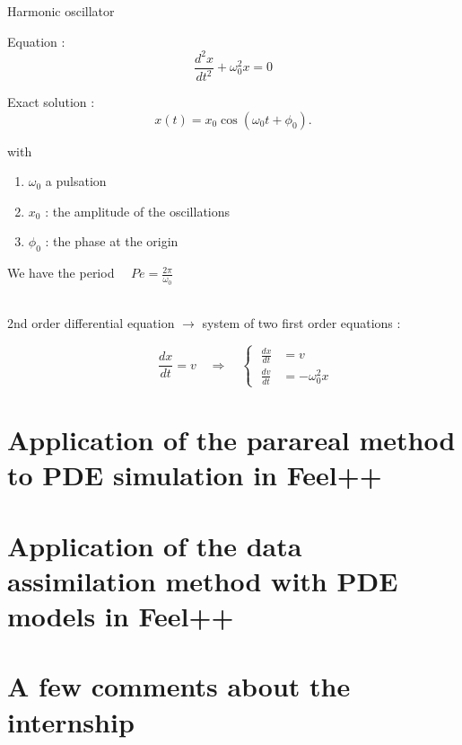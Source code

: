 \documentclass[10pt,xcolor={table,dvipsnames},t]{beamer}
\begin{document}
	\begin{frame}{Harmonic oscillator}
		\begin{minipage}{0.48\linewidth}
			Equation :
			$$\frac{d^2 x}{d t^2}+\omega_0^2 x = 0$$
		\end{minipage}
		\begin{minipage}{0.48\linewidth}
			Exact solution :
			$$x(t) = x_0 \cos(\omega_{0}t+\phi_0).$$ 
		\end{minipage}	
		with
		\begin{enumerate}[\textbullet]
			\item $\omega_0$ a pulsation
			\item $x_0$ : the amplitude of the oscillations
			\item $\phi_0$ : the phase at the origin
		\end{enumerate}
		We have the period $\quad Pe=\frac{2\pi}{\omega_0}$
		
		\; \\
		
		2nd order differential equation $\rightarrow$ system of two first order equations :
		
		$$\qquad \frac{d x}{d t}=v \quad \Rightarrow \quad \left\{\;\begin{aligned}
			\frac{d x}{d t}&=v \\
			\frac{d v}{d t}&=-\omega_0^2 x
		\end{aligned}\right.
		$$  
		
	\end{frame}

	\section{Application of the parareal method to PDE simulation in Feel++}

	
	
	\section{Application of the data assimilation method with PDE models in Feel++}
	
	
	
	\section{A few comments about the internship}
	
\end{document}
